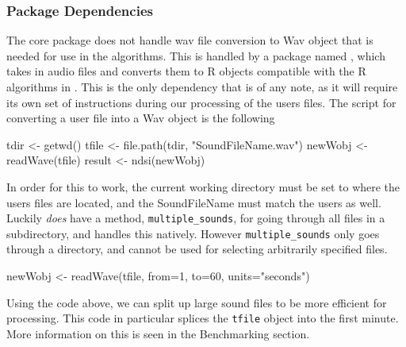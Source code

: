\subsubsection{Package Dependencies}
The core  package does not handle wav file conversion to Wav object that is needed for use in the algorithms. This is handled by a package named , which takes in audio files and converts them to R objects compatible with the R algorithms in . This is the only dependency that is of any note, as it will require its own set of instructions during our processing of the user\textquotesingle s files. The script for converting a user file into a Wav object is the following

\begin{javascriptcode}
tdir <- getwd()
tfile <- file.path(tdir, "SoundFileName.wav")
newWobj <- readWave(tfile)
result <- ndsi(newWobj)
\end{javascriptcode}

In order for this to work, the current working directory must be set to where the user\textquotesingle s files are located, and the SoundFileName must match the user\textquotesingle s as well. Luckily  \textit{does} have a method, \verb|multiple_sounds|, for going through all files in a subdirectory, and handles this natively. However \verb|multiple_sounds| only goes through a directory, and cannot be used for selecting arbitrarily specified files.\\

\begin{javascriptcode}
newWobj <- readWave(tfile, from=1, to=60, units="seconds")
\end{javascriptcode}

Using the code above, we can split up large sound files to be more efficient for processing. This code in particular splices the \verb|tfile| object into the first minute. More information on this is seen in the Benchmarking section.

